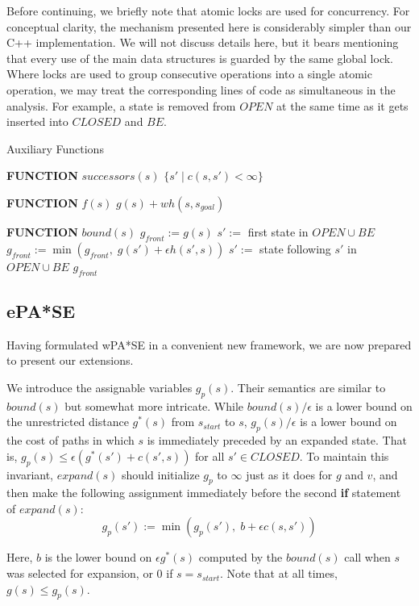\documentclass[letterpaper]{article}
\begin{document}
Before continuing, we briefly note that atomic locks are used for concurrency. For conceptual clarity, the mechanism presented here is considerably simpler than our C++ implementation. We will not discuss details here, but it bears mentioning that every use of the main data structures is guarded by the same global lock. Where locks are used to group consecutive operations into a single atomic operation, we may treat the corresponding lines of code as simultaneous in the analysis. For example, a state is removed from $OPEN$ at the same time as it gets inserted into $CLOSED$ and $BE$.

\begin{algorithm}
\caption{Auxiliary Functions}
\label{alg:aux}
\begin{algorithmic}
\STATE \textbf{FUNCTION} $successors(s)$
\RETURN $\{s' \mid c(s,s')<\infty\}$

\STATE \textbf{FUNCTION} $f(s)$
\RETURN $g(s) + wh(s,s_{goal})$

\STATE \textbf{FUNCTION} $bound(s)$
\STATE $g_{front} := g(s)$
\STATE $s' :=$ first state in $OPEN \cup BE$
\STATE $g_{front} := \min(g_{front},\;g(s') + \epsilon h(s',s))$
\STATE $s' :=$ state following $s'$ in $OPEN \cup BE$
\ENDWHILE
\RETURN $g_{front}$
\end{algorithmic}
\end{algorithm}

\subsection{ePA*SE}

Having formulated wPA*SE in a convenient new framework, we are now prepared to present our extensions.

We introduce the assignable variables $g_p(s)$. Their semantics are similar to $bound(s)$ but somewhat more intricate. While $bound(s)/\epsilon$ is a lower bound on the unrestricted distance $g^*(s)$ from $s_{start}$ to $s$, $g_p(s)/\epsilon$ is a lower bound on the cost of paths in which $s$ is immediately preceded by an expanded state. That is, $g_p(s) \le \epsilon (g^*(s') + c(s',s))$ for all $s'\in CLOSED$. To maintain this invariant, $expand(s)$ should initialize $g_p$ to $\infty$ just as it does for $g$ and $v$, and then make the following assignment immediately before the second \textbf{if} statement of $expand(s)$:
\[g_p(s') := \min(g_p(s'),\; b + \epsilon c(s,s'))\]

Here, $b$ is the lower bound on $\epsilon g^*(s)$ computed by the $bound(s)$ call when $s$ was selected for expansion, or $0$ if $s=s_{start}$. Note that at all times, $g(s) \le g_p(s)$.
\end{document}
